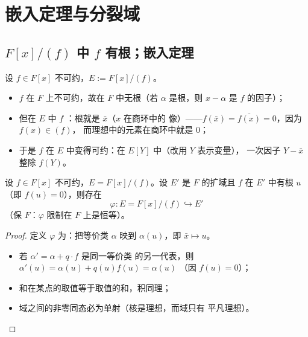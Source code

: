 \section{嵌入定理与分裂域}\label{sec:splitting}

\subsection{\texorpdfstring{$F[x]/(f)$}{F[x]/(f)} 中
\texorpdfstring{$f$}{f} 有根；嵌入定理}

\begin{remark}[观察：不可约多项式在商环中获得根]
设 $f\in F[x]$ 不可约，$E := F[x]/(f)$。
\begin{itemize}[leftmargin=1.3em,itemsep=2pt]
  \item $f$ 在 $F$ 上不可约，故在 $F$ 中无根（若 $\alpha$ 是根，则
        $x - \alpha$ 是 $f$ 的因子）；
  \item 但在 $E$ 中 $f$ ：根就是 $\bar x$（$x$ 在商环中的
        像）——$f(\bar x) = \overline{f(x)} = 0$，因为 $f(x)\in(f)$，
        而理想中的元素在商环中就是 $0$；
  \item 于是 $f$ 在 $E$ 中变得可约：在 $E[Y]$ 中（改用 $Y$ 表示变量），
        一次因子 $Y - \bar x$ 整除 $f(Y)$。
\end{itemize}
\end{remark}

\begin{theorem}
设 $f\in F[x]$ 不可约，$E = F[x]/(f)$。设 $E'$ 是 $F$ 的扩域且 $f$ 在
$E'$ 中有根 $u$（即 $f(u) = 0$），则存在
\[
  \varphi\colon E = F[x]/(f)\hookrightarrow E'
\]
（保 $F$：$\varphi$ 限制在 $F$ 上是恒等）。
\end{theorem}

\begin{proof}
定义 $\varphi$ 为：把等价类 $\alpha$ 映到
$\alpha(u)$，即 $\bar x\mapsto u$。
\begin{itemize}[leftmargin=1.3em,itemsep=2pt]
  \item {}若 $\alpha' = \alpha + q\cdot f$ 是同一等价类
        的另一代表，则 $\alpha'(u) = \alpha(u) + q(u)f(u) = \alpha(u)$
        （因 $f(u) = 0$）；
  \item {}和在某点的取值等于取值的和，积同理；
  \item {}域之间的非零同态必为单射（核是理想，而域只有
        平凡理想）。
\end{itemize}
\end{proof}

